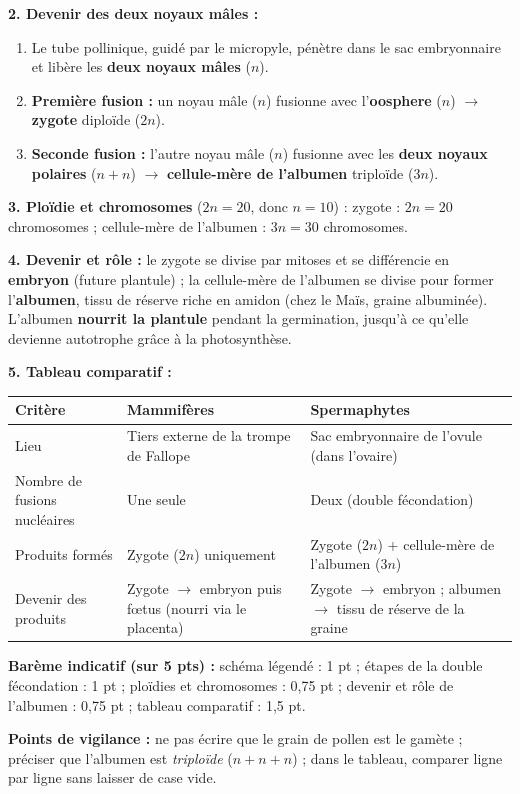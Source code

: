 \documentclass[11pt]{article}
\begin{document}
\begin{corrige}
\textbf{2. Devenir des deux noyaux mâles :}
\begin{enumerate}
\item Le tube pollinique, guidé par le micropyle, pénètre dans le sac embryonnaire et libère les \textbf{deux noyaux mâles} ($n$).
\item \textbf{Première fusion :} un noyau mâle ($n$) fusionne avec l'\textbf{oosphere} ($n$) $\rightarrow$ \textbf{zygote} diploïde ($2n$).
\item \textbf{Seconde fusion :} l'autre noyau mâle ($n$) fusionne avec les \textbf{deux noyaux polaires} ($n + n$) $\rightarrow$ \textbf{cellule-mère de l'albumen} triploïde ($3n$).
\end{enumerate}

\textbf{3. Ploïdie et chromosomes} ($2n = 20$, donc $n = 10$) : zygote : $2n = 20$ chromosomes ; cellule-mère de l'albumen : $3n = 30$ chromosomes.

\textbf{4. Devenir et rôle :} le zygote se divise par mitoses et se différencie en \textbf{embryon} (future plantule) ; la cellule-mère de l'albumen se divise pour former l'\textbf{albumen}, tissu de réserve riche en amidon (chez le Maïs, graine albuminée). L'albumen \textbf{nourrit la plantule} pendant la germination, jusqu'à ce qu'elle devienne autotrophe grâce à la photosynthèse.

\textbf{5. Tableau comparatif :}
\begin{center}
\begin{tabularx}{\linewidth}{|l|X|X|}\hline
\rowcolor{popblueL} Critère & Mammifères & Spermaphytes \\ \hline
Lieu & Tiers externe de la trompe de Fallope & Sac embryonnaire de l'ovule (dans l'ovaire) \\ \hline
Nombre de fusions nucléaires & Une seule & Deux (double fécondation) \\ \hline
Produits formés & Zygote ($2n$) uniquement & Zygote ($2n$) + cellule-mère de l'albumen ($3n$) \\ \hline
Devenir des produits & Zygote $\rightarrow$ embryon puis f\oe tus (nourri via le placenta) & Zygote $\rightarrow$ embryon ; albumen $\rightarrow$ tissu de réserve de la graine \\ \hline
\end{tabularx}
\end{center}

\textbf{Barème indicatif (sur 5 pts) :} schéma légendé : 1 pt ; étapes de la double fécondation : 1 pt ; ploïdies et chromosomes : 0,75 pt ; devenir et rôle de l'albumen : 0,75 pt ; tableau comparatif : 1,5 pt.

\textbf{Points de vigilance :} ne pas écrire que le grain de pollen est le gamète ; préciser que l'albumen est \emph{triploïde} ($n + n + n$) ; dans le tableau, comparer ligne par ligne sans laisser de case vide.
\end{corrige}
\end{document}
